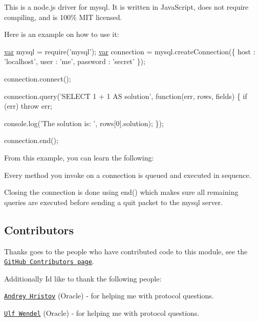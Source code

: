 This is a node.\+js driver for mysql. It is written in Java\+Script, does not require compiling, and is 100\% M\+I\+T licensed.

Here is an example on how to use it\+:


\begin{DoxyCode}
\hyperlink{018__def_8c_a335628f2e9085305224b4f9cc6e95ed5}{var} mysql      = require(\textcolor{stringliteral}{'mysql'});
\hyperlink{018__def_8c_a335628f2e9085305224b4f9cc6e95ed5}{var} connection = mysql.createConnection(\{
  host     : \textcolor{stringliteral}{'localhost'},
  user     : \textcolor{stringliteral}{'me'},
  password : \textcolor{stringliteral}{'secret'}
\});

connection.connect();

connection.query(\textcolor{stringliteral}{'SELECT 1 + 1 AS solution'}, \textcolor{keyword}{function}(err, rows, fields) \{
  \textcolor{keywordflow}{if} (err) \textcolor{keywordflow}{throw} err;

  console.log(\textcolor{stringliteral}{'The solution is: '}, rows[0].solution);
\});

connection.end();
\end{DoxyCode}


From this example, you can learn the following\+:


\begin{DoxyItemize}
\item Every method you invoke on a connection is queued and executed in sequence.
\item Closing the connection is done using {\ttfamily end()} which makes sure all remaining queries are executed before sending a quit packet to the mysql server.
\end{DoxyItemize}

\subsection*{Contributors}

Thanks goes to the people who have contributed code to this module, see the \href{https://github.com/felixge/node-mysql/graphs/contributors}{\tt Git\+Hub Contributors page}.

Additionally I\textquotesingle{}d like to thank the following people\+:


\begin{DoxyItemize}
\item \href{http://andrey.hristov.com/}{\tt Andrey Hristov} (Oracle) -\/ for helping me with protocol questions.
\item \href{http://blog.ulf-wendel.de/}{\tt Ulf Wendel} (Oracle) -\/ for helping me with protocol questions.
\end{DoxyItemize}

